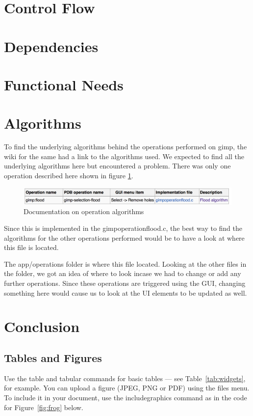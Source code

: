 \section{Control Flow}
\section{Dependencies}
\section{Functional Needs}
\section{Algorithms}
To find the underlying algorithms behind the operations performed on gimp, the wiki for the same had a link to the algorithms used. We expected to find all the underlying algorithms here but encountered a problem. There was only one operation described here shown in figure \ref{fig:algorithm}.

\begin{figure}
\centering
\includegraphics[width=1\textwidth]{algorithm.png}
\caption{\label{fig:algorithm}Documentation on operation algorithms}
\end{figure}

Since this is implemented in the gimpoperationflood.c, the best way to find the algorithms for the other operations performed would be to have a look at where this file is located.
 
The app/operations folder is where this file located. Looking at the other files in the folder, we got an idea of where to look incase we had to change or add any further operations. Since these operations are triggered using the GUI, changing something here would cause us to look at the UI elements to be updated as well.

\section{Conclusion}

\subsection{Tables and Figures}

Use the table and tabular commands for basic tables --- see Table~\ref{tab:widgets}, for example. You can upload a figure (JPEG, PNG or PDF) using the files menu. To include it in your document, use the includegraphics command as in the code for Figure~\ref{fig:frog} below.


